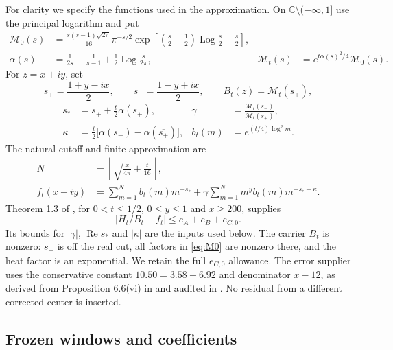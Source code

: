 \documentclass[11pt]{article}
\theoremstyle{remark}
\newcommand{\C}{\mathbb C}
\DeclareMathOperator{\Rea}{Re}
\DeclareMathOperator{\Log}{Log}
\numberwithin{equation}{section}
\begin{document}
For clarity we specify the functions used in the approximation. On
$\C\setminus(-\infty,1]$ use the principal logarithm and put
\begin{align}
 \mathcal M_0(s)&=\frac{s(s-1)\sqrt{2\pi}}{16}\pi^{-s/2}
 \exp\!\left[\left(\frac s2-\frac12\right)\Log\frac s2-\frac s2\right],\label{eq:M0}\\
 \alpha(s)&=\frac1{2s}+\frac1{s-1}+\frac12\Log\frac{s}{2\pi},
 &\mathcal M_t(s)&=e^{t\alpha(s)^2/4}\mathcal M_0(s).
 \label{eq:alpha}
\end{align}
For $z=x+iy$, set
\[
 s_+=\frac{1+y-ix}{2},\qquad s_-=\frac{1-y+ix}{2},\qquad
 B_t(z)=\mathcal M_t(s_+),
\]
\begin{align}
 s_*&=s_++\frac t2\alpha(s_+),
 &\gamma&=\frac{\mathcal M_t(s_-)}{\mathcal M_t(s_+)},\label{eq:sstar}\\
 \kappa&=\frac t2\bigl[\alpha(s_-)-\alpha(\overline{s_+})\bigr],
 &b_t(m)&=e^{(t/4)\log^2m}.\label{eq:kappa}
\end{align}
The natural cutoff and finite approximation are
\begin{align}
 N&=\left\lfloor\sqrt{\frac{x}{4\pi}+\frac t{16}}\right\rfloor,\label{eq:cutoff}\\
 f_t(x+iy)&=\sum_{m=1}^N b_t(m)m^{-s_*}
 +\gamma\sum_{m=1}^N m^y b_t(m)m^{-\overline{s_*}-\kappa}.
 \label{eq:f}
\end{align}
Theorem 1.3 of \cite{polymath}, for $0<t\le1/2$, $0\le y\le1$ and
$x\ge200$, supplies
\begin{equation}\label{eq:approx}
 \left|H_t/B_t-f_t\right|\le e_A+e_B+e_{C,0}.
\end{equation}
Its bounds for $|\gamma|$, $\Rea s_*$ and $|\kappa|$ are the inputs
used below. The carrier $B_t$ is nonzero: $s_+$ is off the real cut,
all factors in \eqref{eq:M0} are nonzero there, and the heat factor is an
exponential. We retain the full $e_{C,0}$ allowance. The error supplier uses
the conservative constant $10.50=3.58+6.92$ and denominator $x-12$,
as derived from Proposition 6.6(vi) in \cite{polymath} and audited in
\cite{audit4}. No residual from a different corrected center is inserted.

\subsection{Frozen windows and coefficients}
\end{document}
